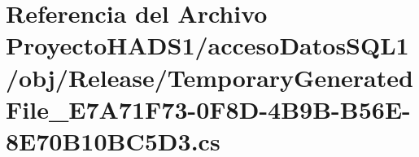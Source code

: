 \hypertarget{_proyecto_h_a_d_s1_2acceso_datos_s_q_l1_2obj_2_release_2_temporary_generated_file___e7_a71_f73-08cf1b27e1c3e148ac22a7e4a817c5c75}{}\section{Referencia del Archivo Proyecto\+H\+A\+D\+S1/acceso\+Datos\+S\+Q\+L1/obj/\+Release/\+Temporary\+Generated\+File\+\_\+\+E7\+A71\+F73-\/0\+F8\+D-\/4\+B9\+B-\/\+B56\+E-\/8\+E70\+B10\+B\+C5\+D3.cs}
\label{_proyecto_h_a_d_s1_2acceso_datos_s_q_l1_2obj_2_release_2_temporary_generated_file___e7_a71_f73-08cf1b27e1c3e148ac22a7e4a817c5c75}
